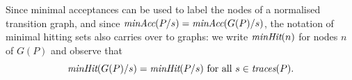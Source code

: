 Since minimal acceptances can be used to label the nodes of a normalised transition graph, and since $\text{\it minAcc}(P/s) = \text{\it minAcc}(G(P)/s)$, the notation of minimal hitting sets also
carries over to graphs: we write $\text{\it minHit}(n)$ for nodes $n$ of $G(P)$ and observe that
\begin{equation}
\label{eq:minhitsGP}
\text{\it minHit}(G(P)/s) = \text{\it minHit}(P/s) \ \text{for all}\ s\in \text{\it traces}(P).
\end{equation}















